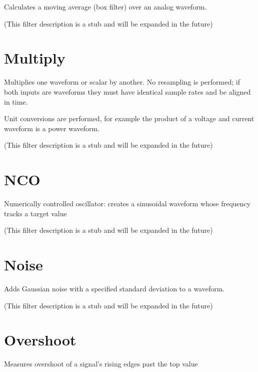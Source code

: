 Calculates a moving average (box filter) over an analog waveform.

(This filter description is a stub and will be expanded in the future)

\pagebreak
\section{Multiply}

Multiplies one waveform or scalar by another. No resampling is performed; if both inputs are waveforms they must
have identical sample rates and be aligned in time.

Unit conversions are performed, for example the product of a voltage and current waveform is a power waveform.

(This filter description is a stub and will be expanded in the future)

\pagebreak
\section{NCO}

Numerically controlled oscillator: creates a sinusoidal waveform whose frequency tracks a target value

(This filter description is a stub and will be expanded in the future)

\pagebreak
\section{Noise}

Adds Gaussian noise with a specified standard deviation to a waveform.

(This filter description is a stub and will be expanded in the future)

\pagebreak
\section{Overshoot}

Measures overshoot of a signal's rising edges past the top value

